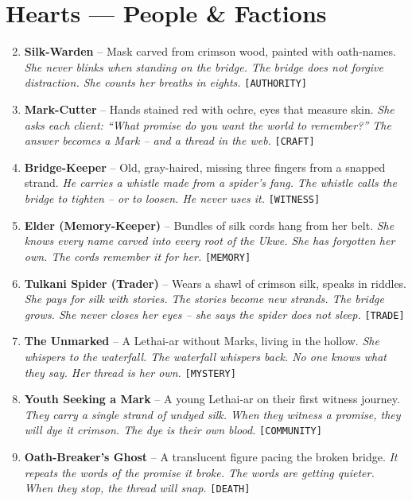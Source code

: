 \section*{Hearts --- People \& Factions}
\label{sec:lethaiar-people}
\begin{enumerate}
\setcounter{enumi}{1}
\item \textbf{Silk-Warden} -- Mask carved from crimson wood, painted with oath-names.
  \hfill \textit{She never blinks when standing on the bridge. The bridge does not forgive distraction. She counts her breaths in eights.} \texttt{[AUTHORITY]}
\item \textbf{Mark-Cutter} -- Hands stained red with ochre, eyes that measure skin.
  \hfill \textit{She asks each client: ``What promise do you want the world to remember?'' The answer becomes a Mark -- and a thread in the web.} \texttt{[CRAFT]}
\item \textbf{Bridge-Keeper} -- Old, gray-haired, missing three fingers from a snapped strand.
  \hfill \textit{He carries a whistle made from a spider's fang. The whistle calls the bridge to tighten -- or to loosen. He never uses it.} \texttt{[WITNESS]}
\item \textbf{Elder (Memory-Keeper)} -- Bundles of silk cords hang from her belt.
  \hfill \textit{She knows every name carved into every root of the Ukwe. She has forgotten her own. The cords remember it for her.} \texttt{[MEMORY]}
\item \textbf{Tulkani Spider (Trader)} -- Wears a shawl of crimson silk, speaks in riddles.
  \hfill \textit{She pays for silk with stories. The stories become new strands. The bridge grows. She never closes her eyes -- she says the spider does not sleep.} \texttt{[TRADE]}
\item \textbf{The Unmarked} -- A Lethai-ar without Marks, living in the hollow.
  \hfill \textit{She whispers to the waterfall. The waterfall whispers back. No one knows what they say. Her thread is her own.} \texttt{[MYSTERY]}
\item \textbf{Youth Seeking a Mark} -- A young Lethai-ar on their first witness journey.
  \hfill \textit{They carry a single strand of undyed silk. When they witness a promise, they will dye it crimson. The dye is their own blood.} \texttt{[COMMUNITY]}
\item \textbf{Oath-Breaker's Ghost} -- A translucent figure pacing the broken bridge.
  \hfill \textit{It repeats the words of the promise it broke. The words are getting quieter. When they stop, the thread will snap.} \texttt{[DEATH]}

\end{enumerate}
